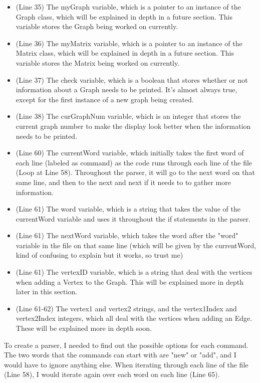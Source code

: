 \documentclass[letterpaper, 10pt]{article}
\begin{document}
\begin{itemize}
    \item (Line 35) The myGraph variable, which is a pointer to an instance of the Graph class, which will be explained in depth in a future section. This variable stores the Graph being worked on currently.
    \vspace{1em}
    \item (Line 36) The myMatrix variable, which is a pointer to an instance of the Matrix class, which will be explained in depth in a future section. This variable stores the Matrix being worked on currently.
    \item (Line 37) The check variable, which is a boolean that stores whether or not information about a Graph needs to be printed. It's almost always true, except for the first instance of a new graph being created.
    \item (Line 38) The curGraphNum variable, which is an integer that stores the current graph number to make the display look better when the information needs to be printed.
    \item (Line 60) The currentWord variable, which initially takes the first word of each line (labeled as command) as the code runs through each line of the file (Loop at Line 58). Throughout the parser, it will go to the next word on that same line, and then to the next and next if it needs to to gather more information.
    \item (Line 61) The word variable, which is a string that takes the value of the currentWord variable and uses it throughout the if statements in the parser.
    \item (Line 61) The nextWord variable, which takes the word after the "word" variable in the file on that same line (which will be given by the currentWord, kind of confusing to explain but it works, so trust me)
    \item (Line 61) The vertexID variable, which is a string that deal with the vertices when adding a Vertex to the Graph. This will be explained more in depth later in this section.
    \item (Line 61-62) The vertex1 and vertex2 strings, and the vertex1Index and vertex2Index integers, which all deal with the vertices when adding an Edge. These will be explained more in depth soon.
\end{itemize}

\noindent
To create a parser, I needed to find out the possible options for each command. The two words that the commands can start with are "new" or "add", and I would have to ignore anything else. When iterating through each line of the file (Line 58), I would iterate again over each word on each line (Line 65). 
\end{document}
